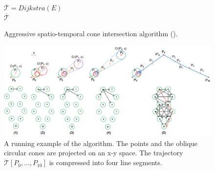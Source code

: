 \begin{figure}[tb!]
\begin{center}
{\begin{minipage}{3.36in}
{					\icc \hspace{1ex} $\overline{\mathcal{T}} = {Dijkstra}(E)$\\
					\icc \hspace{1ex}\Return $\overline{\mathcal{T}}$
				}
				\vspace{-2ex}
				\myhrule
			\end{minipage}
		}
	\end{center}
	\vspace{-2ex}
	\caption{\small Aggressive spatio-temporal cone intersection algorithm (\cista).}
	\label{alg:ciseda}
	\vspace{-2ex}
\end{figure}


\begin{figure}[tb!]
	\centering
	\includegraphics[scale=0.8]{figures/Fig-CISED-O.png}
	\caption{\small A running example of the \cisto algorithm. The points and the oblique circular cones are projected on an x-y space. The trajectory $\dddot{\mathcal{T}}[P_0, \ldots, P_{10}]$ is compressed into four line segments.}
	\vspace{-1ex}
	\label{fig:exm-const}
\end{figure}


